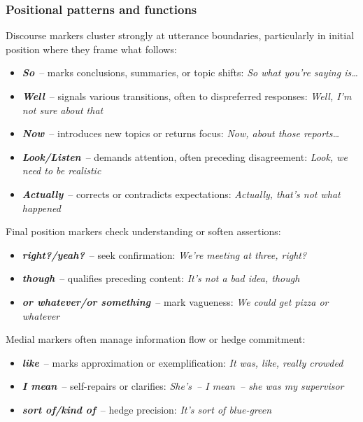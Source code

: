 \subsubsection*{Positional patterns and functions}

Discourse markers cluster strongly at utterance boundaries, particularly in initial position where they frame what follows:

\begin{itemize}[noitemsep]
   \item \textbf{\textit{So}}~-- marks conclusions, summaries, or topic shifts: \textit{So what you're saying is\dots}
   \item \textbf{\textit{Well}}~-- signals various transitions, often to dispreferred responses: \textit{Well, I'm not sure about that}
   \item \textbf{\textit{Now}}~-- introduces new topics or returns focus: \textit{Now, about those reports\dots}
   \item \textbf{\textit{Look/Listen}}~-- demands attention, often preceding disagreement: \textit{Look, we need to be realistic}
   \item \textbf{\textit{Actually}}~-- corrects or contradicts expectations: \textit{Actually, that's not what happened}
\end{itemize}

Final position markers check understanding or soften assertions:

\begin{itemize}[noitemsep]
   \item \textbf{\textit{right?/yeah?}}~-- seek confirmation: \textit{We're meeting at three, right?}
   \item \textbf{\textit{though}}~-- qualifies preceding content: \textit{It's not a bad idea, though}
   \item \textbf{\textit{or whatever/or something}}~-- mark vagueness: \textit{We could get pizza or whatever}
\end{itemize}

Medial markers often manage information flow or hedge commitment:

\begin{itemize}[noitemsep]
   \item \textbf{\textit{like}}~-- marks approximation or exemplification: \textit{It was, like, really crowded}
   \item \textbf{\textit{I mean}}~-- self-repairs or clarifies: \textit{She's~-- I mean~-- she was my supervisor}
   \item \textbf{\textit{sort of/kind of}}~-- hedge precision: \textit{It's sort of blue-green}
\end{itemize}

